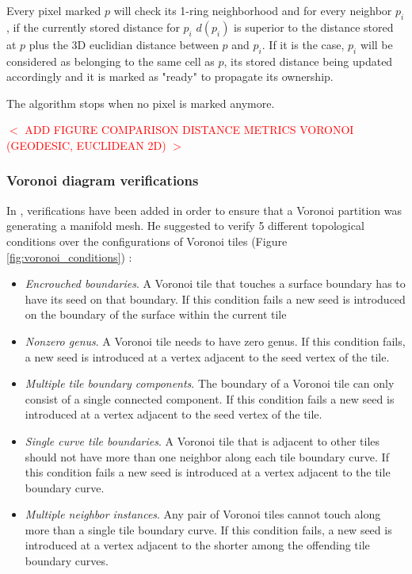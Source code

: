 \documentclass[11pt,fleqn]{book} %
\newcommand{\arnaud}[1]{\textcolor{red}{$<$ #1 $>$}}
\begin{document}
Every pixel marked $p$ will check its 1-ring neighborhood and for every neighbor $p_i$, if the currently stored distance for $p_i$ $d(p_i)$ is superior to the distance stored at $p$ plus the 3D euclidian distance between $p$ and $p_i$. 
If it is the case, $p_i$ will be considered as belonging to the same cell as $p$, its stored distance being updated accordingly and it is marked as "ready" to propagate its ownership.

The algorithm stops when no pixel is marked anymore.

\arnaud{ADD FIGURE COMPARISON DISTANCE METRICS VORONOI (GEODESIC, EUCLIDEAN 2D)}

\subsubsection{Voronoi diagram verifications}
In \cite{Gus07}, verifications have been added in order to ensure that a Voronoi partition was generating a manifold mesh.
He suggested to verify 5 different topological conditions over the configurations of Voronoi tiles (Figure \ref{fig:voronoi_conditions}) : 
\begin{itemize}
	\item \textit{Encrouched boundaries}. A Voronoi tile that touches a surface boundary has to have its seed on that boundary. 
	If this condition fails a new seed is introduced on the boundary of the surface within the current tile
	\item \textit{Nonzero genus}. A Voronoi tile needs to have zero genus. If this condition fails, a new seed is introduced at a vertex adjacent to the seed vertex of the tile.
	\item \textit{Multiple tile boundary components}. The boundary of a Voronoi tile can only consist of a single connected component. If this condition fails a new seed is introduced at a vertex adjacent to the seed vertex of the tile.
	\item \textit{Single curve tile boundaries}. A Voronoi tile that is adjacent to other tiles should not have more than one neighbor along each tile boundary curve. If this condition fails a new seed is introduced at a vertex adjacent to the tile boundary curve.
	\item \textit{Multiple neighbor instances}. Any pair of Voronoi tiles cannot touch along more than a single tile boundary curve. If this condition fails, a new seed is introduced at a vertex adjacent to the shorter among the offending tile boundary curves.
\end{itemize}
\end{document}
